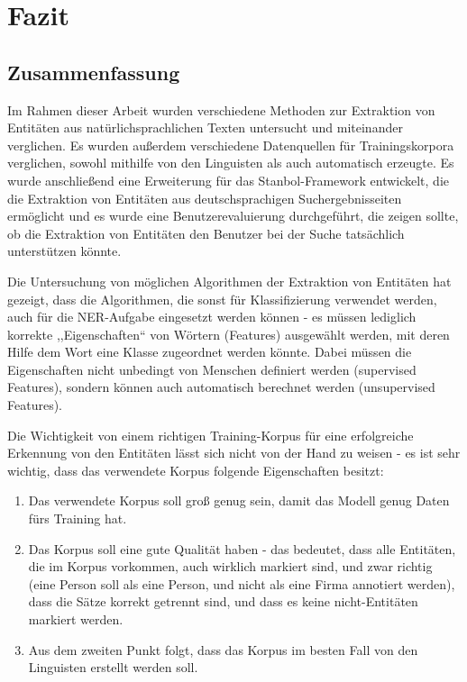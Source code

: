 \chapter{Fazit}

\section{Zusammenfassung}
Im Rahmen dieser Arbeit wurden verschiedene Methoden zur Extraktion von Entitäten aus natürlichsprachlichen Texten untersucht und miteinander verglichen. Es wurden außerdem verschiedene Datenquellen für Trainingskorpora verglichen, sowohl mithilfe von den Linguisten als auch automatisch erzeugte. Es wurde anschließend eine Erweiterung für das Stanbol-Framework entwickelt, die die Extraktion von Entitäten aus deutschsprachigen Suchergebnisseiten ermöglicht und es wurde eine Benutzerevaluierung durchgeführt, die zeigen sollte, ob die Extraktion von Entitäten den Benutzer bei der Suche tatsächlich unterstützen könnte. 

Die Untersuchung von möglichen Algorithmen der Extraktion von Entitäten hat gezeigt, dass die Algorithmen, die sonst für Klassifizierung verwendet werden, auch für die NER-Aufgabe eingesetzt werden können - es müssen lediglich korrekte ,,Eigenschaften`` von Wörtern (Features) ausgewählt werden, mit deren Hilfe dem Wort eine Klasse zugeordnet werden könnte. Dabei müssen die Eigenschaften nicht unbedingt von Menschen definiert werden (supervised Features), sondern können auch automatisch berechnet werden (unsupervised Features).

Die Wichtigkeit von einem richtigen Training-Korpus für eine erfolgreiche Erkennung von den Entitäten lässt sich nicht von der Hand zu weisen - es ist sehr wichtig, dass das verwendete Korpus folgende Eigenschaften besitzt:
\begin{enumerate}
\item Das verwendete Korpus soll groß genug sein, damit das Modell genug Daten fürs Training hat.
\item Das Korpus soll eine gute Qualität haben - das bedeutet, dass alle Entitäten, die im Korpus vorkommen, auch wirklich markiert sind, und zwar richtig (eine Person soll als eine Person, und nicht als eine Firma annotiert werden), dass die Sätze korrekt getrennt sind, und dass es keine nicht-Entitäten markiert werden.
\item Aus dem zweiten Punkt folgt, dass das Korpus im besten Fall von den Linguisten erstellt werden soll.
\end{enumerate}

